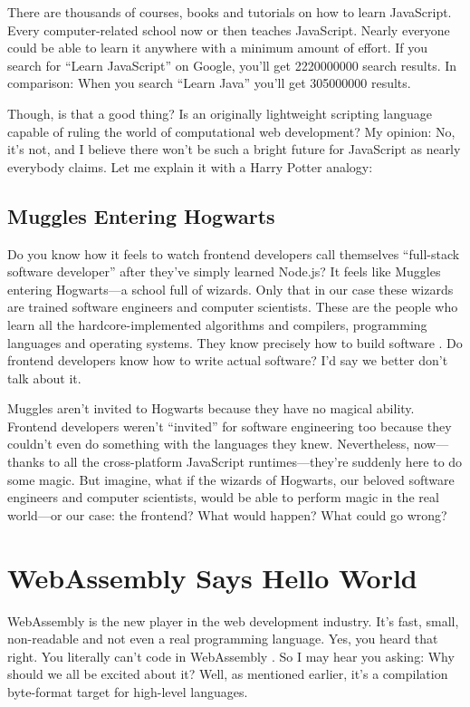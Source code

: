 \documentclass[10pt]{article}
\begin{document}
\begin{sloppypar}
  There are thousands of courses, books and tutorials on how to learn JavaScript. Every computer-related school now or then teaches JavaScript. Nearly everyone could be able to learn it anywhere with a minimum amount of effort. If you search for “Learn JavaScript” on Google, you’ll get \num{2220000000} search results. In comparison: When you search “Learn Java” you’ll get \num{305000000} results.

  Though, is that a good thing? Is an originally lightweight scripting language capable of ruling the world of computational web development? My opinion: No, it’s not, and I believe there won’t be such a bright future for JavaScript as nearly everybody claims. Let me explain it with a Harry Potter analogy:

  \subsection{Muggles Entering Hogwarts}
  \label{sec:muggles}

  Do you know how it feels to watch frontend developers call themselves “full-stack software developer” after they’ve simply learned Node.js? It feels like Muggles entering Hogwarts—a school full of wizards. Only that in our case these wizards are trained software engineers and computer scientists. These are the people who learn all the hardcore-implemented algorithms and compilers, programming languages and operating systems. They know precisely how to build software \citep{might_what_2011}. Do frontend developers know how to write actual software? I’d say we better don’t talk about it.

  Muggles aren’t invited to Hogwarts because they have no magical ability. Frontend developers weren’t “invited” for software engineering too because they couldn’t even do something with the languages they knew. Nevertheless, now—thanks to all the cross-platform JavaScript runtimes—they’re suddenly here to do some magic. But imagine, what if the wizards of Hogwarts, our beloved software engineers and computer scientists, would be able to perform magic in the real world—or our case: the frontend? What would happen? What could go wrong?

  \section{WebAssembly Says Hello World}
  \label{sec:hello-world}

  WebAssembly is the new player in the web development industry. It’s fast, small, non-readable and not even a real programming language. Yes, you heard that right. You literally can’t code in WebAssembly \citep{rourke_learn_2018}. So I may hear you asking: Why should we all be excited about it? Well, as mentioned earlier, it’s a compilation byte-format target for high-level languages.


\end{sloppypar}
\end{document}
